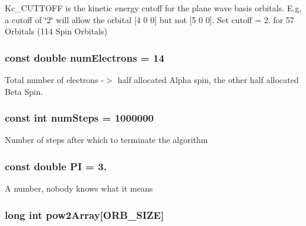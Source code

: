 Kc\-\_\-\-C\-U\-T\-T\-O\-F\-F is the kinetic energy cutoff for the plane wave basis orbitals. E.\-g, a cutoff of \char`\"{}2\char`\"{} will allow the orbital \mbox{[}4 0 0\mbox{]} but not \mbox{[}5 0 0\mbox{]}. Set cutoff = 2. for 57 Orbitals (114 Spin Orbitals) \hypertarget{UEG__MAIN__binarytest_8C_a613e167ad809e33c73b70a24822cc6f9}{
\subsubsection[{num\-Electrons}]{\setlength{\rightskip}{0pt plus 5cm}const double num\-Electrons = 14}}\label{UEG__MAIN__binarytest_8C_a613e167ad809e33c73b70a24822cc6f9}
Total number of electrons -\/$>$ half allocated Alpha spin, the other half allocated Beta Spin. \hypertarget{UEG__MAIN__binarytest_8C_a957840dbdbfa8a29c76754be143dd02f}{
\subsubsection[{num\-Steps}]{\setlength{\rightskip}{0pt plus 5cm}const int num\-Steps = 1000000}}\label{UEG__MAIN__binarytest_8C_a957840dbdbfa8a29c76754be143dd02f}
Number of steps after which to terminate the algorithm \hypertarget{UEG__MAIN__binarytest_8C_a952eac791b596a61bba0a133a3bb439f}{
\subsubsection[{P\-I}]{\setlength{\rightskip}{0pt plus 5cm}const double P\-I = 3.}}\label{UEG__MAIN__binarytest_8C_a952eac791b596a61bba0a133a3bb439f}
A number, nobody knows what it means \hypertarget{UEG__MAIN__binarytest_8C_a5a4a522e121fab9651a940cabf5ac77d}{
\subsubsection[{pow2\-Array}]{\setlength{\rightskip}{0pt plus 5cm}long int pow2\-Array\mbox{[}O\-R\-B\-\_\-\-S\-I\-Z\-E\mbox{]}}}\label{UEG__MAIN__binarytest_8C_a5a4a522e121fab9651a940cabf5ac77d}
